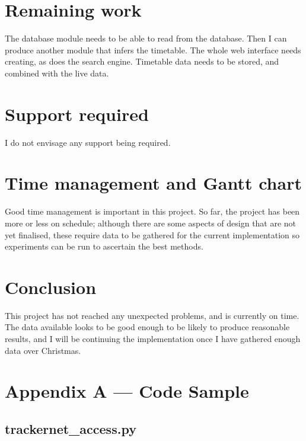 \documentclass[a4paper,12pt]{article}
\begin{document}
\section{Remaining work}

The database module needs to be able to read from the database. Then I can
produce another module that infers the timetable. The whole web interface needs
creating, as does the search engine. Timetable data needs to be stored, and
combined with the live data.

\section{Support required}

I do not envisage any support being required.

\section{Time management and Gantt chart}

Good time management is important in this project. So far, the project has been
more or less on schedule; although there are some aspects of design that are
not yet finalised, these require data to be gathered for the current
implementation so experiments can be run to ascertain the best methods.



\section{Conclusion}

This project has not reached any unexpected problems, and is currently on time.
The data available looks to be good enough to be likely to produce reasonable
results, and I will be continuing the implementation once I have gathered
enough data over Christmas.

\pagebreak





\section*{Appendix A --- Code Sample}

\subsection*{trackernet\_access.py}
\end{document}
